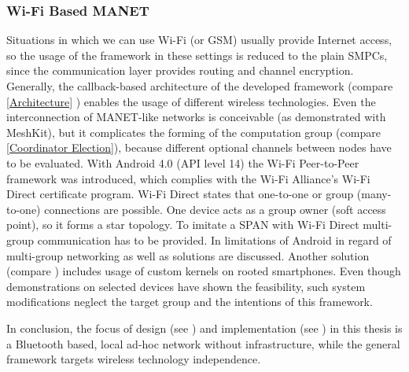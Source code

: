 \subsubsection{Wi-Fi Based \gls{MANET}}

Situations in which we can use Wi-Fi (or \gls{GSM}) usually provide Internet access, so the usage of the framework in these settings is reduced to the plain \gls{SMPC}s, since the communication layer provides routing and channel encryption. Generally, the callback-based architecture of the developed framework (compare \ref{Architecture} ) enables the usage of different wireless technologies. Even the interconnection of \gls{MANET}-like networks is conceivable (as demonstrated with MeshKit), but it complicates the forming of the computation group (compare \ref{Coordinator Election}), because different optional channels between nodes have to be evaluated.
With Android 4.0 (\gls{API} level 14) the Wi-Fi Peer-to-Peer framework was introduced, which complies with the Wi-Fi Alliance's Wi-Fi Direct certificate program. Wi-Fi Direct states that one-to-one or group (many-to-one) connections are possible. One device acts as a group owner (soft access point), so it forms a star topology. To imitate a \gls{SPAN} with Wi-Fi Direct multi-group communication has to be provided. In \textcite{Funai2015} limitations of Android in regard of multi-group networking as well as solutions are discussed.
Another solution (compare \textcite{Online:SPANProject}) includes usage of custom kernels on rooted smartphones. Even though  demonstrations on selected devices have shown the feasibility, such system modifications neglect the target group and the intentions of this framework.

In conclusion, the focus of design (see ) and implementation (see ) in this thesis is a Bluetooth based, local ad-hoc network without infrastructure, while the general framework targets wireless technology independence.




